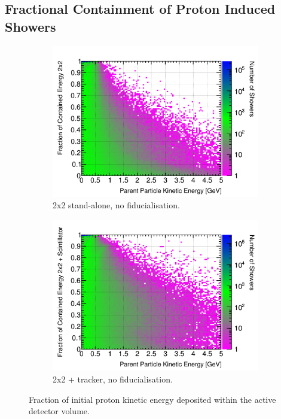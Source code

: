 \documentclass[10pt,a4paper,openany]{article}
\begin{document}
\subsection{Fractional Containment of Proton Induced Showers}
\begin{figure}[!htb]
	\centering
	\begin{subfigure}[b]{0.49\textwidth}
		\centering
		\includegraphics[width=1.0\textwidth]{P_contained_frac_2x2.png}
		\caption{2x2 stand-alone, no fiducialisation.}
		\label{}
	\end{subfigure}	
	\hfill
	\begin{subfigure}[b]{0.49\textwidth}
		\centering
		\includegraphics[width=1.0\textwidth]{P_contained_frac_2x2_Scintillator_gap.png}
		\caption{2x2 + tracker, no fiducialisation.}
		\label{}
	\end{subfigure}	
	\caption{Fraction of initial proton kinetic energy deposited within the active detector volume.}
\end{figure}
\end{document}
